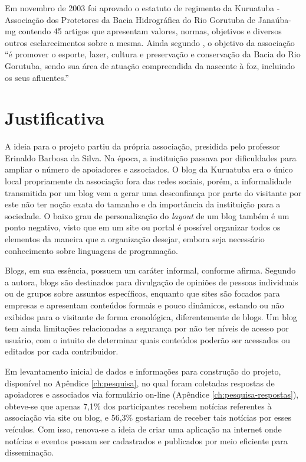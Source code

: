 Em novembro de 2003 foi aprovado o estatuto de regimento da Kuruatuba - Associação dos Protetores da Bacia Hidrográfica do Rio Gorutuba de Janaúba-mg contendo 45 artigos que apresentam valores, normas, objetivos e diversos outros esclarecimentos sobre a mesma. Ainda segundo , o objetivo da associação ``é promover o esporte, lazer, cultura e preservação e conservação da Bacia do Rio Gorutuba, sendo sua área de atuação compreendida da nascente à foz, incluindo os seus afluentes.''

\hspace{2.5cm}
\section{Justificativa}
\hspace{2.5cm}

A ideia para o projeto partiu da própria associação, presidida pelo professor Erinaldo Barbosa da Silva. Na época, a instituição passava por dificuldades para ampliar o número de apoiadores e associados. O blog da Kuruatuba era o único local propriamente da associação fora das redes sociais, porém, a informalidade transmitida por um blog vem a gerar uma desconfiança por parte do visitante por este não ter noção exata do tamanho e da importância da instituição para a sociedade. O baixo grau de personalização do \textit{layout} de um blog também é um ponto negativo, visto que em um site ou portal é possível organizar todos os elementos da maneira que a organização desejar, embora seja necessário conhecimento sobre linguagens de programação. 

Blogs, em sua essência, possuem um caráter informal, conforme  afirma. Segundo a autora, blogs são destinados para divulgação de opiniões de pessoas individuais ou de grupos sobre assuntos específicos, enquanto que sites são focados para empresas e apresentam conteúdos formais e pouco dinâmicos, estando ou não exibidos para o visitante de forma cronológica, diferentemente de blogs. Um blog tem ainda limitações relacionadas a segurança por não ter níveis de acesso por usuário, com o intuito de determinar quais conteúdos poderão ser acessados ou editados por cada contribuidor.


Em levantamento inicial de dados e informações para construção do projeto, disponível no Apêndice \ref{ch:pesquisa}, no qual foram coletadas respostas de apoiadores e associados via formulário on-line (Apêndice \ref{ch:pesquisa-respostas}), obteve-se que apenas 7,1\% dos participantes recebem notícias referentes à associação via site ou blog, e 56,3\% gostariam de receber tais notícias por esses veículos. Com isso, renova-se a ideia de criar uma aplicação na internet onde notícias e eventos possam ser cadastrados e publicados por meio eficiente para disseminação.

